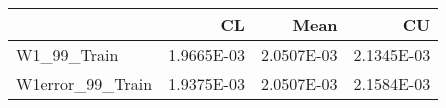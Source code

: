 \begin{tabular}{lrrr}
\toprule
{} &         CL &       Mean &         CU \\
\midrule
W1\_99\_Train      & 1.9665E-03 & 2.0507E-03 & 2.1345E-03 \\
W1error\_99\_Train & 1.9375E-03 & 2.0507E-03 & 2.1584E-03 \\
\bottomrule
\end{tabular}
